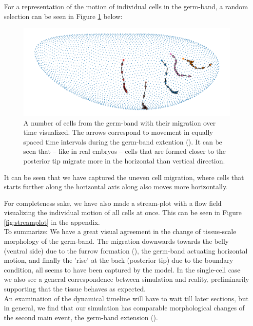 For a representation of the motion of individual cells in the germ-band, a random selection can be seen in Figure \ref{fig:GBMovements} below:
\begin{figure}[H]
    \centering
    \includegraphics[width=1\linewidth]{chapters/Results/figures/movements.png}
    \caption{A number of cells from the germ-band with their migration over time visualized. The arrows correspond to movement in equally spaced time intervals during the germ-band extention ().
    It can be seen that -- like in real embryos -- cells that are formed closer to the posterior tip migrate more in the horizontal than vertical direction.}
    \label{fig:GBMovements}
\end{figure}

It can be seen that we have captured the uneven cell migration, where cells that starts further along the horizontal axis along also moves more horizontally. 

For completeness sake, we have also made a stream-plot with a flow field visualizing the individual motion of all cells at once. This can be seen in Figure \ref{fig:streamplot} in the appendix.\\


To summarize: We have a great visual agreement in the change of tissue-scale morphology of the germ-band. The migration downwards towards the belly (ventral side) due to the furrow formation (), the germ-band actuating horizontal motion, and finally the 'rise' at the back (posterior tip) due to the boundary condition, all seems to have been captured by the model. In the single-cell case we also see a general correspondence between simulation and reality, preliminarily supporting that the tissue behaves as expected.\\  


An examination of the dynamical timeline will have to wait till later sections, but in general, we find that our simulation has comparable morphological changes of the second main event, the germ-band extension ().


